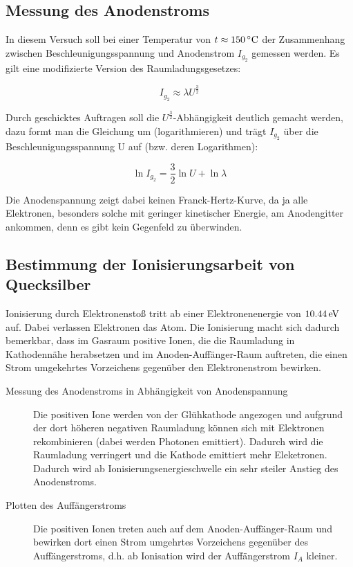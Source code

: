 \documentclass[a4paper,titlepage]{scrartcl}
\numberwithin{equation}{section}
\begin{document}
\subsection{Messung des Anodenstroms}

In diesem Versuch soll bei einer Temperatur von $t \approx \unit[150]{^\circ C}$ der Zusammenhang zwischen Beschleunigungsspannung und Anodenstrom $I_{g_2}$ gemessen werden. Es gilt eine modifizierte Version des Raumladungsgesetzes:

\begin{equation*}
I_{g_2} \approx \lambda U^{\frac{3}{2}}
\end{equation*}

Durch geschicktes Auftragen soll die $U^{\frac{3}{2}}$-Abhängigkeit deutlich gemacht werden, dazu formt man die Gleichung um (logarithmieren) und trägt $I_{g_2}$ über die Beschleunigungsspannung U auf (bzw. deren Logarithmen):

\begin{equation*}
\ln{I_{g_2}} =  \frac{3}{2} \ln U + \ln \lambda
\end{equation*}

Die Anodenspannung zeigt dabei keinen Franck-Hertz-Kurve, da ja alle Elektronen, besonders solche mit geringer kinetischer Energie, am Anodengitter ankommen, denn es gibt kein Gegenfeld zu überwinden.

\subsection{Bestimmung der Ionisierungsarbeit von Quecksilber}
Ionisierung durch Elektronenstoß tritt ab einer Elektronenenergie von $\unit[10.44]{eV}$ auf. Dabei verlassen Elektronen das Atom. Die Ionisierung macht sich dadurch bemerkbar, dass im Gasraum positive Ionen, die die Raumladung in Kathodennähe herabsetzen und im Anoden-Auffänger-Raum auftreten, die einen Strom umgekehrtes Vorzeichens gegenüber den Elektronenstrom bewirken.

\begin{description}
\item[Messung des Anodenstroms in Abhängigkeit von Anodenspannung] Die positiven Ione werden von der Glühkathode angezogen und aufgrund der dort höheren negativen Raumladung können sich mit Elektronen rekombinieren (dabei werden Photonen emittiert). Dadurch wird die Raumladung verringert und die Kathode emittiert mehr Eleketronen. Dadurch wird ab Ionisierungsenergieschwelle ein sehr steiler Anstieg des Anodenstroms.
\item[Plotten des Auffängerstroms] Die positiven Ionen treten auch auf dem Anoden-Auffänger-Raum und bewirken dort einen Strom umgehrtes Vorzeichens gegenüber des Auffängerstroms, d.h. ab Ionisation wird der Auffängerstrom $I_A$ kleiner.
\end{description}
\end{document}
